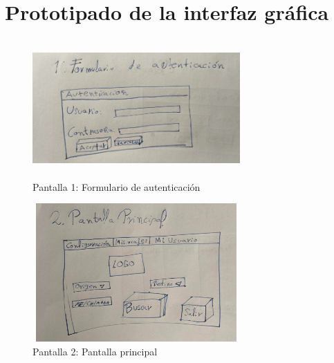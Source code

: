 \section{Prototipado de la interfaz gráfica}\label{sec:prototipado_de_la_interfaz_grafica}
\begin{figure}
    \centering
    \includegraphics[width=300px,height=200px]{recursos/prototipos/autenticacion}
    \caption{Pantalla 1: Formulario de autenticación}
    \label{fig:autenticacion}
\end{figure}

\begin{figure}
    \centering
    \includegraphics[width=300px,height=200px]{recursos/prototipos/pantalla_principal}
    \caption{Pantalla 2: Pantalla principal}
    \label{fig:pantalla_principal}
\end{figure}

